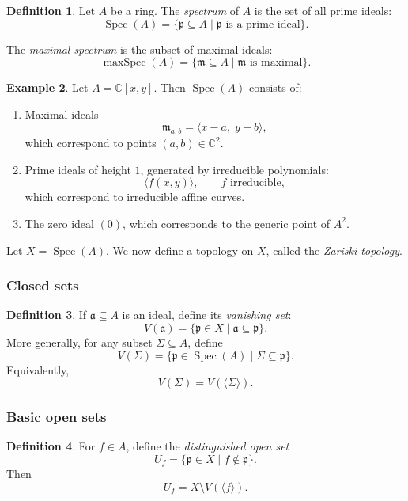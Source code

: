 \documentclass[11pt,a4paper]{article}
\theoremstyle{definition}
\newtheorem{definition}{Definition}[section]
\newtheorem{example}[definition]{Example}
\theoremstyle{plain}
\theoremstyle{remark}
\newcommand{\C}{\mathbb{C}}
\newcommand{\Spec}{\operatorname{Spec}}
\newcommand{\maxSpec}{\operatorname{maxSpec}}
\begin{document}
\begin{definition}
Let $A$ be a ring. The \emph{spectrum} of $A$ is the set of all prime ideals:
\[
\Spec(A)=\{\mathfrak p\subseteq A \mid \mathfrak p \text{ is a prime ideal}\}.
\]

The \emph{maximal spectrum} is the subset of maximal ideals:
\[
\maxSpec(A)=\{\mathfrak m\subseteq A \mid \mathfrak m \text{ is maximal}\}.
\]
\end{definition}

\begin{example}
Let $A=\C[x,y]$. Then $\Spec(A)$ consists of:
\begin{enumerate}
\item Maximal ideals
\[
\mathfrak m_{a,b}=\langle x-a,\;y-b\rangle,
\]
which correspond to points $(a,b)\in\C^2$.

\item Prime ideals of height $1$, generated by irreducible polynomials:
\[
\langle f(x,y)\rangle,\qquad f \text{ irreducible},
\]
which correspond to irreducible affine curves.

\item The zero ideal $(0)$, which corresponds to the generic point of $A^2$.
\end{enumerate}
\end{example}

\medskip

Let $X=\Spec(A)$. We now define a topology on $X$, called the \emph{Zariski topology}.

\subsubsection*{Closed sets}

\begin{definition}
If $\mathfrak a\subseteq A$ is an ideal, define its \emph{vanishing set}:
\[
V(\mathfrak a)=\{\mathfrak p\in X \mid \mathfrak a\subseteq \mathfrak p\}.
\]
More generally, for any subset $\Sigma\subseteq A$, define
\[
V(\Sigma)=\{\mathfrak p\in\Spec(A)\mid \Sigma\subseteq\mathfrak p\}.
\]
Equivalently,
\[
V(\Sigma)=V(\langle\Sigma\rangle).
\]
\end{definition}

\subsubsection*{Basic open sets}

\begin{definition}
For $f\in A$, define the \emph{distinguished open set}
\[
U_{f}=\{\mathfrak p\in X\mid f\notin\mathfrak p\}.
\]
Then
\[
U_{f}=X\setminus V(\langle f\rangle).
\]
\end{definition}
\end{document}
